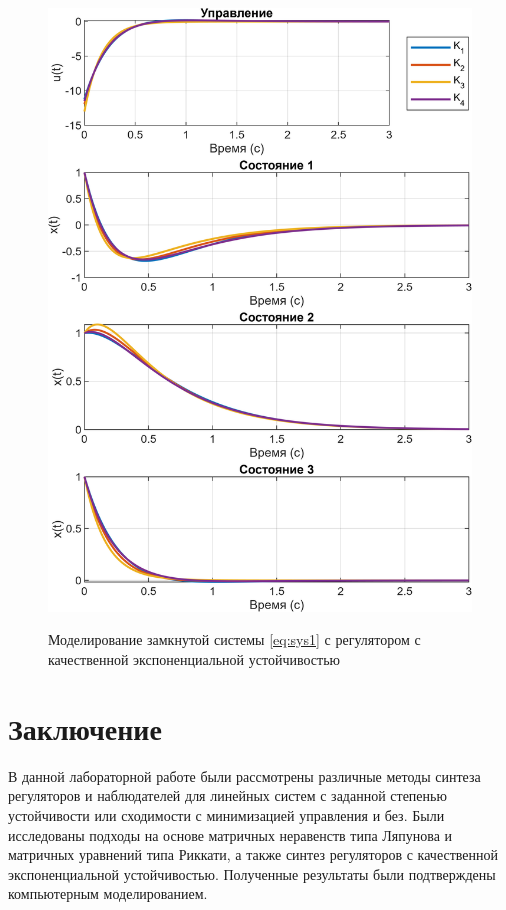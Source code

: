 \begin{figure}[H]
    \centering
    \caption{Моделирование замкнутой системы \eqref{eq:sys1} с регулятором с
    качественной экспоненциальной устойчивостью}
    \includegraphics[width=\linewidth]{figs/task31.png}
    \label{fig:riccati2}
\end{figure}


\section{Заключение}

В данной лабораторной работе были рассмотрены различные методы синтеза регуляторов 
и наблюдателей для линейных систем с заданной степенью устойчивости или сходимости 
с минимизацией управления и без. 
Были исследованы подходы на 
основе матричных неравенств типа Ляпунова и матричных уравнений типа Риккати, 
а также синтез регуляторов с качественной экспоненциальной устойчивостью. 
Полученные результаты были подтверждены компьютерным моделированием.